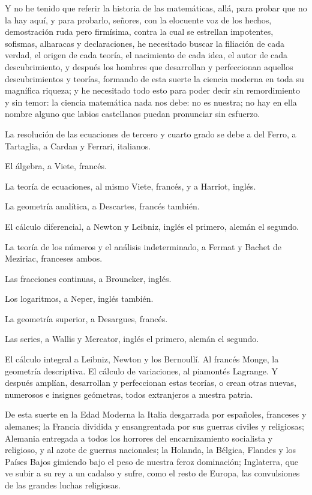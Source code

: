\documentclass[a4paper, 12pt]{article}
\begin{document}
{{{{Y no he tenido que referir la historia de las matemáticas, allá, para probar que no la hay aquí, y para probarlo, señores, con la elocuente voz de los hechos, demostración ruda pero firmísima, contra la cual se estrellan impotentes, sofismas, alharacas y declaraciones, he necesitado buscar la filiación de cada verdad, el origen de cada teoría, el nacimiento de cada idea, el autor de cada descubrimiento, y después los hombres que desarrollan y perfeccionan aquellos descubrimientos y teorías, formando de esta suerte la ciencia moderna en toda su magnífica riqueza; y he necesitado todo esto para poder decir sin remordimiento y sin temor: la ciencia matemática nada nos debe: no es nuestra; no hay en ella nombre alguno que labios castellanos puedan pronunciar sin esfuerzo.

La resolución de las ecuaciones de tercero y cuarto grado se debe a del Ferro, a Tartaglia, a Cardan y Ferrari, italianos.

El álgebra, a Viete, francés.

La teoría de ecuaciones, al mismo Viete, francés, y a Harriot, inglés.

La geometría analítica, a Descartes, francés también.

El cálculo diferencial, a Newton y Leibniz, inglés el primero, alemán el segundo.

La teoría de los números y el análisis indeterminado, a Fermat y Bachet de Meziriac, franceses ambos.

Las fracciones continuas, a Brouncker, inglés.

Los logaritmos, a Neper, inglés también.

La geometría superior, a Desargues, francés.

Las series, a Wallis y Mercator, inglés el primero, alemán el segundo.

El cálculo integral a Leibniz, Newton y los Bernoullí.  Al francés Monge, la geometría descriptiva.  El cálculo de variaciones, al piamontés Lagrange.  Y después amplían, desarrollan y perfeccionan estas teorías, o crean otras nuevas, numerosos e insignes geómetras, todos extranjeros a nuestra patria.

De esta suerte en la Edad Moderna la Italia desgarrada por españoles, franceses y alemanes; la Francia dividida y ensangrentada por sus guerras civiles y religiosas; Alemania entregada a todos los horrores del encarnizamiento socialista y religioso, y al azote de guerras nacionales; la Holanda, la Bélgica, Flandes y los Países Bajos gimiendo bajo el peso de nuestra feroz dominación; Inglaterra, que ve subir a su rey a un cadalso y sufre, como el resto de Europa, las convulsiones de las grandes luchas religiosas.

}}}}
\end{document}
